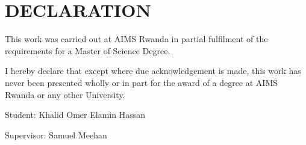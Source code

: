 \chapter*{DECLARATION}
This work was carried out at AIMS Rwanda in partial fulfilment of the requirements for a Master of Science Degree.

I hereby declare that except where due acknowledgement is made, this work has never been presented wholly or in part for the award of a degree at AIMS Rwanda or any other University.

\vspace{1.5cm}
Student: Khalid Omer Elamin Hassan %

\vspace{1.5cm}

Supervisor: Samuel Meehan


%
%
%
%
